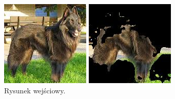 \documentclass[10pt]{llncs}
\begin{document}
\begin{figure}[!htb]
  \includegraphics[width=\linewidth]{img/images.jpg}
  \caption{Rysunek wejściowy.}\label{fig:10}
\endminipage\hfill
{}
  \includegraphics[width=\linewidth]{img/images_k5_0.jpg}

\end{figure}
\end{document}
